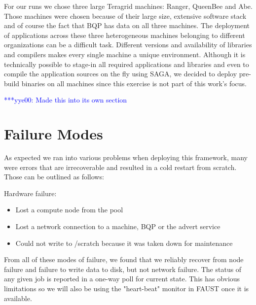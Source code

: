 \documentclass[conference,final]{IEEEtran}
\newcommand{\jhanote}[1]{ {\textcolor{red} { ***Jha: #1 }}}
\newcommand{\yyenote}[1]{ {\textcolor{blue} { ***yye00: #1 }}}
\newcommand{\jhanote}[1]{}
\newcommand{\yyenote}[1]{}
\begin{document}
For our runs we chose three large Teragrid machines: Ranger, QueenBee
and Abe. Those machines were chosen because of their large size, extensive software
stack and of course the fact that BQP has data on all three machines. The 
deployment of applications across these three heterogeneous machines
belonging to different organizations can be a difficult
task. Different versions and availability of libraries and compilers
makes every single machine a unique environment. Although it is
technically possible to stage-in all required applications and
libraries and even to compile the application sources on the fly using
SAGA, we decided to deploy pre-build binaries on all machines since
this exercise is not part of this work's focus.


\yyenote{Made this into its own section}

\section{Failure Modes}


As expected we ran into various problems when deploying this
framework, many were errors that are irrecoverable and resulted in a
cold restart from scratch. Those can be outlined as follows:

Hardware failure:
\begin{itemize}
\item{Lost a compute node from the pool}
\item{Lost a network connection to a machine, BQP or the advert service}
\item{Could not write to /scratch because it was taken down for maintenance}
\end{itemize}
From all of these modes of failure, we found that we reliably recover
from node failure and failure to write data to disk, but not network failure. The
status of any given job is reported in a one-way poll for current state. This
has obvious limitations so we will also be using the "heart-beat" monitor in FAUST
once it is available.
\end{document}
